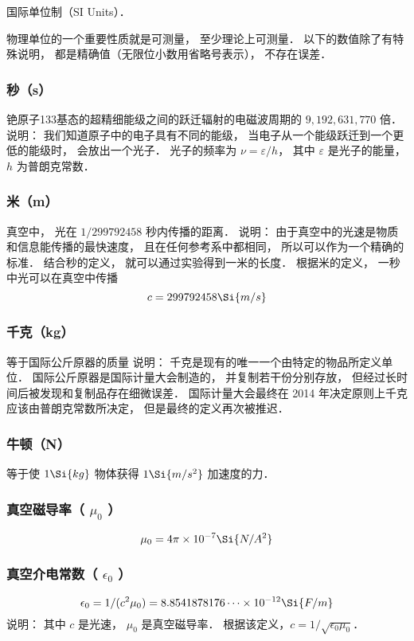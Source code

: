 
国际单位制（SI Units）．

物理单位的一个重要性质就是可测量， 至少理论上可测量． 以下的数值除了有特殊说明， 都是精确值（无限位小数用省略号表示）， 不存在误差．

\subsubsection{秒（s）}
铯原子133基态的超精细能级之间的跃迁辐射的电磁波周期的 $9, 192, 631, 770$ 倍． 
说明： 我们知道原子中的电子具有不同的能级， 当电子从一个能级跃迁到一个更低的能级时， 会放出一个光子． 光子的频率为 $\nu  = \varepsilon /h$，   其中 $\varepsilon $ 是光子的能量， $h$ 为普朗克常数．

\subsubsection{米（m）}
真空中， 光在 $1/299792458$ 秒内传播的距离． 说明： 由于真空中的光速是物质和信息能传播的最快速度， 且在任何参考系中都相同， 所以可以作为一个精确的标准． 结合秒的定义， 就可以通过实验得到一米的长度． 根据米的定义， 一秒中光可以在真空中传播
\begin{equation}
c = 299792458 \Si{m/s}
\end{equation}

\subsubsection{千克（kg）}
等于国际公斤原器的质量
说明： 千克是现有的唯一一个由特定的物品所定义单位． 国际公斤原器是国际计量大会制造的， 并复制若干份分别存放， 但经过长时间后被发现和复制品存在细微误差． 国际计量大会最终在 2014 年决定原则上千克应该由普朗克常数所决定， 但是最终的定义再次被推迟．

\subsubsection{牛顿（N）}
等于使 $1\Si{kg}$ 物体获得 $1\Si{m/s^2}$ 加速度的力．

\subsubsection{真空磁导率（ $\mu_0$ ）}
\begin{equation}
\mu_0 = 4\pi \times 10^{-7} \Si{N/A^2}
\end{equation}

\subsubsection{真空介电常数（ $\epsilon_0$ ）}
\begin{equation}
\epsilon_0 = 1/(c^2 \mu_0) = 8.8541878176\dots \times 10^{-12} \Si{F/m}
\end{equation}
说明： 其中 $c$ 是光速， $\mu_0$ 是真空磁导率． 根据该定义，$c = 1/\sqrt{\epsilon_0 \mu_0} $．  

